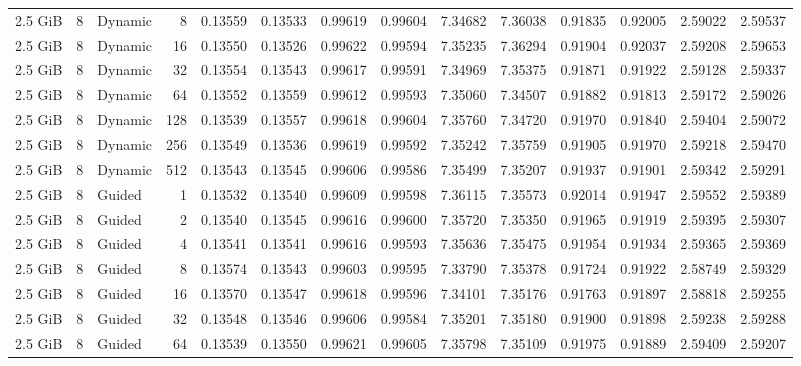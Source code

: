 \begin{table}[H]
\begin{adjustbox}{width=\textwidth, keepaspectratio}
\begin{tabular}{rrlrrrrrrrrrrr}
                    2.5 GiB & 8 & Dynamic & 8 & 0.13559 & 0.13533 & 0.99619 & 0.99604 & 7.34682 & 7.36038 & 0.91835 & 0.92005 & 2.59022 & 2.59537 \\
                    2.5 GiB & 8 & Dynamic & 16 & 0.13550 & 0.13526 & 0.99622 & 0.99594 & 7.35235 & 7.36294 & 0.91904 & 0.92037 & 2.59208 & 2.59653 \\
                    2.5 GiB & 8 & Dynamic & 32 & 0.13554 & 0.13543 & 0.99617 & 0.99591 & 7.34969 & 7.35375 & 0.91871 & 0.91922 & 2.59128 & 2.59337 \\
                    2.5 GiB & 8 & Dynamic & 64 & 0.13552 & 0.13559 & 0.99612 & 0.99593 & 7.35060 & 7.34507 & 0.91882 & 0.91813 & 2.59172 & 2.59026 \\
                    2.5 GiB & 8 & Dynamic & 128 & 0.13539 & 0.13557 & 0.99618 & 0.99604 & 7.35760 & 7.34720 & 0.91970 & 0.91840 & 2.59404 & 2.59072 \\
                    2.5 GiB & 8 & Dynamic & 256 & 0.13549 & 0.13536 & 0.99619 & 0.99592 & 7.35242 & 7.35759 & 0.91905 & 0.91970 & 2.59218 & 2.59470 \\
                    2.5 GiB & 8 & Dynamic & 512 & 0.13543 & 0.13545 & 0.99606 & 0.99586 & 7.35499 & 7.35207 & 0.91937 & 0.91901 & 2.59342 & 2.59291 \\
                    2.5 GiB & 8 & Guided & 1 & 0.13532 & 0.13540 & 0.99609 & 0.99598 & 7.36115 & 7.35573 & 0.92014 & 0.91947 & 2.59552 & 2.59389 \\
                    2.5 GiB & 8 & Guided & 2 & 0.13540 & 0.13545 & 0.99616 & 0.99600 & 7.35720 & 7.35350 & 0.91965 & 0.91919 & 2.59395 & 2.59307 \\
                    2.5 GiB & 8 & Guided & 4 & 0.13541 & 0.13541 & 0.99616 & 0.99593 & 7.35636 & 7.35475 & 0.91954 & 0.91934 & 2.59365 & 2.59369 \\
                    2.5 GiB & 8 & Guided & 8 & 0.13574 & 0.13543 & 0.99603 & 0.99595 & 7.33790 & 7.35378 & 0.91724 & 0.91922 & 2.58749 & 2.59329 \\
                    2.5 GiB & 8 & Guided & 16 & 0.13570 & 0.13547 & 0.99618 & 0.99596 & 7.34101 & 7.35176 & 0.91763 & 0.91897 & 2.58818 & 2.59255 \\
                    2.5 GiB & 8 & Guided & 32 & 0.13548 & 0.13546 & 0.99606 & 0.99584 & 7.35201 & 7.35180 & 0.91900 & 0.91898 & 2.59238 & 2.59288 \\
                    2.5 GiB & 8 & Guided & 64 & 0.13539 & 0.13550 & 0.99621 & 0.99605 & 7.35798 & 7.35109 & 0.91975 & 0.91889 & 2.59409 & 2.59207 \\

\end{tabular}
\end{adjustbox}
\end{table}
